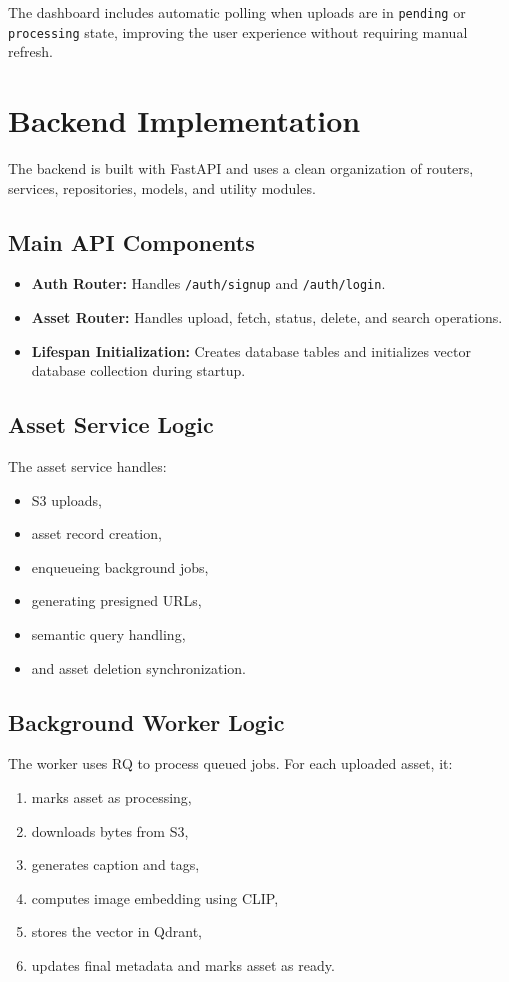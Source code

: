 \documentclass[12pt,a4paper]{report}
\begin{document}
The dashboard includes automatic polling when uploads are in \texttt{pending} or \texttt{processing} state, improving the user experience without requiring manual refresh.

\section{Backend Implementation}
The backend is built with FastAPI and uses a clean organization of routers, services, repositories, models, and utility modules.

\subsection{Main API Components}
\begin{itemize}[leftmargin=*]
    \item \textbf{Auth Router:} Handles \texttt{/auth/signup} and \texttt{/auth/login}.
    \item \textbf{Asset Router:} Handles upload, fetch, status, delete, and search operations.
    \item \textbf{Lifespan Initialization:} Creates database tables and initializes vector database collection during startup.
\end{itemize}

\subsection{Asset Service Logic}
The asset service handles:
\begin{itemize}[leftmargin=*]
    \item S3 uploads,
    \item asset record creation,
    \item enqueueing background jobs,
    \item generating presigned URLs,
    \item semantic query handling,
    \item and asset deletion synchronization.
\end{itemize}

\subsection{Background Worker Logic}
The worker uses RQ to process queued jobs. For each uploaded asset, it:
\begin{enumerate}[leftmargin=*]
    \item marks asset as processing,
    \item downloads bytes from S3,
    \item generates caption and tags,
    \item computes image embedding using CLIP,
    \item stores the vector in Qdrant,
    \item updates final metadata and marks asset as ready.
\end{enumerate}
\end{document}
